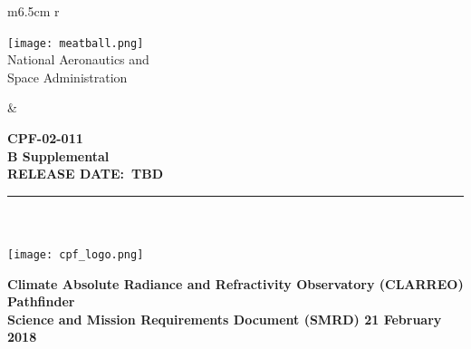 \documentclass[12pt,oneside,oldfontcommands]{memoir}
\date[\mydate]{\today}
\title{\mycpftitle}
\author{\myauthor}
\date{\mydate}
\def\mytitle{Title}
\def\mytitle{Science and Mission Requirements Document (SMRD)}
\def\mydate{21 February 2018}
\def\releasedate{TBD}
\def\documentnumber{CPF-02-011}
\def\titlepagerevision{REV. B}
\def\revision{B Supplemental }
\def\titlepagerevision{\revision}
\begin{document}


\mainmatter
\VerbatimFootnotes


%
%
\captionnamefont{\small\sffamily}
\captiontitlefont{\small\sffamily}
\renewcommand\thefigure{\thesection-\arabic{figure}} 
\renewcommand\thetable{\thesection-\arabic{table}}
%
%

% 

\thispagestyle{firststyle}
\sffamily
\setlength\voffset{-18pt}
\setlength{\floatsep}{10pt plus 1.0pt minus 2.0pt}
\vspace{-0.25in}
\begin{table}[h!]
  \begin{tabular}{ m{6.5cm} r }
    \begin{minipage}{4in}
      \texttt{[image: meatball.png]}\\
        \textsf{\noindent
        \footnotesize{National Aeronautics and\\
        \vspace{-5pt}Space Administration}
        }

    \end{minipage}
    &
    \begin{minipage}[t]{10cm}
    \vspace{0.3in}
    \sffamily
    \raggedleft\Large\bfseries \documentnumber\\
    \normalsize \MakeUppercase \titlepagerevision\\
    \raggedleft\bfseries
    RELEASE DATE:~\MakeTextUppercase\releasedate
    \end{minipage}
  \end{tabular}
\end{table}
\vspace{-0.3in}
\rule{\linewidth}{2.25pt}
~\\
~\\
\vspace{0.42in}
\centering
\texttt{[image: cpf\_logo.png]}

\Large\bfseries
	Climate Absolute Radiance and Refractivity Observatory (CLARREO) Pathfinder \\
\vspace{0.4in}
\mytitle
\normalsize
\vspace{0.25in}
\mydate \\
\normalfont
\vspace{0.05in}
\clearpage
\end{document}
